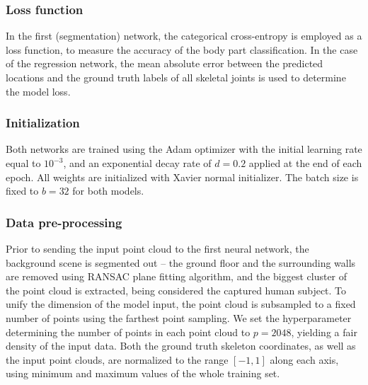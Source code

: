 
\subsubsection{Loss function}
In the first (segmentation) network, the categorical cross-entropy is employed as a loss function, to measure the accuracy of the body part classification. In the case of the regression network, the mean absolute error between the predicted locations and the ground truth labels of all skeletal joints is used to determine the model loss.

\subsubsection{Initialization}
Both networks are trained using the Adam optimizer with the initial learning rate equal to $10^{-3}$, and an exponential decay rate of $d=0.2$ applied at the end of each epoch. All weights are initialized with Xavier normal initializer. The batch size is fixed to $b=32$ for both models.

\subsubsection{Data pre-processing}
Prior to sending the input point cloud to the first neural network, the background scene is segmented out – the ground floor and the surrounding walls are removed using RANSAC plane fitting algorithm, and the biggest cluster of the point cloud is extracted, being considered the captured human subject. To unify the dimension of the model input, the point cloud is subsampled to a fixed number of points using the farthest point sampling. We set the hyperparameter determining the number of points in each point cloud to $p = 2048$, yielding a fair density of the input data. Both the ground truth skeleton coordinates, as well as the input point clouds, are normalized to the range $[-1, 1]$ along each axis, using minimum and maximum values of the whole training set.

